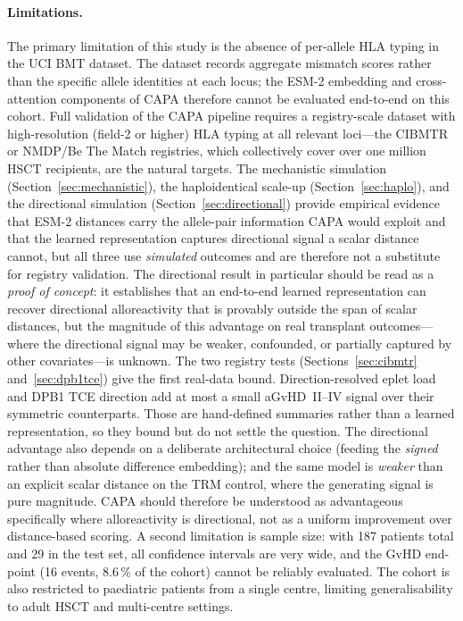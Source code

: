 \documentclass[11pt,a4paper]{article}
\begin{document}
\paragraph{Limitations.}
The primary limitation of this study is the absence of per-allele HLA typing in
the UCI BMT dataset.  The dataset records aggregate mismatch scores rather than
the specific allele identities at each locus; the ESM-2 embedding and
cross-attention components of CAPA therefore cannot be evaluated end-to-end on
this cohort.  Full validation of the CAPA pipeline requires a registry-scale
dataset with high-resolution (field-2 or higher) HLA typing at all relevant
loci---the CIBMTR or NMDP/Be The Match registries, which collectively cover
over one million HSCT recipients, are the natural targets.  The mechanistic
simulation (Section~\ref{sec:mechanistic}), the haploidentical scale-up
(Section~\ref{sec:haplo}), and the directional simulation
(Section~\ref{sec:directional}) provide empirical evidence that ESM-2 distances
carry the allele-pair information CAPA would exploit and that the learned
representation captures directional signal a scalar distance cannot, but all
three use \emph{simulated} outcomes and are therefore not a substitute for
registry validation.  The directional result in particular should be read as a
\emph{proof of concept}: it establishes that an end-to-end learned
representation can recover directional alloreactivity that is provably outside
the span of scalar distances, but the magnitude of this advantage on real
transplant outcomes---where the directional signal may be weaker, confounded,
or partially captured by other covariates---is unknown.  The two registry
tests (Sections~\ref{sec:cibmtr} and~\ref{sec:dpb1tce}) give the first
real-data bound.  Direction-resolved eplet load and DPB1 TCE direction add at
most a small aGvHD~II--IV signal over their symmetric counterparts.  Those are
hand-defined summaries rather than a learned representation, so they bound
but do not settle the question.  The directional
advantage also depends on a deliberate architectural choice (feeding the
\emph{signed} rather than absolute difference embedding); and the same model is
\emph{weaker} than an explicit scalar distance on the TRM control, where the
generating signal is pure magnitude.  CAPA should therefore be understood as
advantageous specifically where alloreactivity is directional, not as a
uniform improvement over distance-based scoring.  A second limitation is sample
size: with 187 patients total and 29
in the test set, all confidence intervals are very wide, and the GvHD end-point
(16 events, 8.6\,\% of the cohort) cannot be reliably evaluated.  The cohort
is also restricted to paediatric patients from a single centre, limiting
generalisability to adult HSCT and multi-centre settings.
\end{document}
